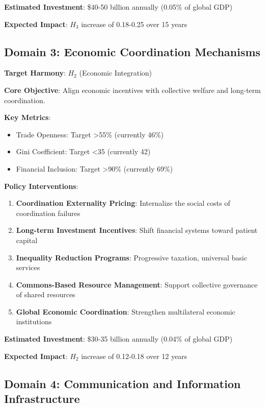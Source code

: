 \documentclass[12pt,letterpaper]{article}
\begin{document}
\textbf{Estimated Investment}: \$40-50 billion annually (0.05\% of global GDP)

\textbf{Expected Impact}: $H_3$ increase of 0.18-0.25 over 15 years

\subsection{Domain 3: Economic Coordination Mechanisms}

\textbf{Target Harmony}: $H_2$ (Economic Integration)

\textbf{Core Objective}: Align economic incentives with collective welfare and long-term coordination.

\textbf{Key Metrics}:
\begin{itemize}
    \item Trade Openness: Target >55\% (currently 46\%)
    \item Gini Coefficient: Target <35 (currently 42)
    \item Financial Inclusion: Target >90\% (currently 69\%)
\end{itemize}

\textbf{Policy Interventions}:

\begin{enumerate}
    \item \textbf{Coordination Externality Pricing}: Internalize the social costs of coordination failures
    \item \textbf{Long-term Investment Incentives}: Shift financial systems toward patient capital
    \item \textbf{Inequality Reduction Programs}: Progressive taxation, universal basic services
    \item \textbf{Commons-Based Resource Management}: Support collective governance of shared resources
    \item \textbf{Global Economic Coordination}: Strengthen multilateral economic institutions
\end{enumerate}

\textbf{Estimated Investment}: \$30-35 billion annually (0.04\% of global GDP)

\textbf{Expected Impact}: $H_2$ increase of 0.12-0.18 over 12 years

\subsection{Domain 4: Communication and Information Infrastructure}
\end{document}
